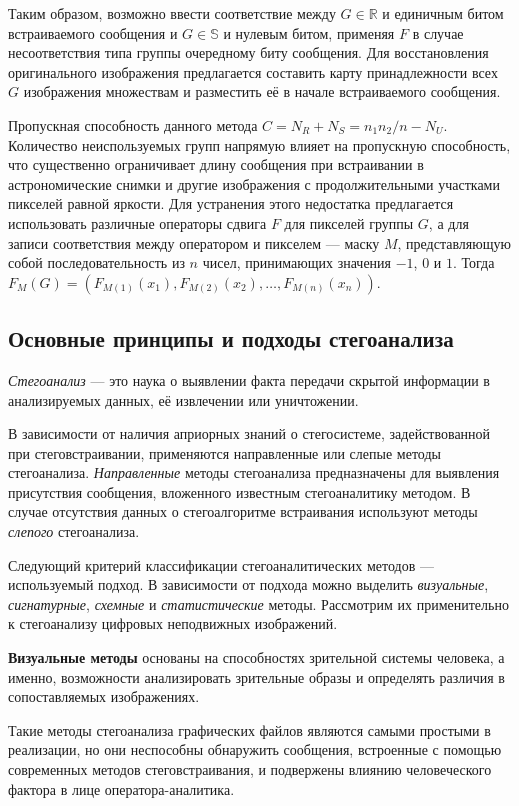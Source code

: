 Таким образом, возможно ввести соответствие между $ G \in \mathbb{R} $ и единичным битом встраиваемого сообщения и $ G \in \mathbb{S} $ и нулевым битом, применяя $ F $ в случае несоответствия типа группы очередному биту сообщения. Для восстановления оригинального изображения предлагается составить карту принадлежности всех $ G $ изображения множествам и разместить её в начале встраиваемого сообщения.

Пропускная способность данного метода $ C = N_R + N_S = {n_1}{n_2}/{n} - N_U $. Количество неиспользуемых групп напрямую влияет на пропускную способность, что существенно ограничивает длину сообщения при встраивании в астрономические снимки и другие изображения с продолжительными участками пикселей равной яркости. Для устранения этого недостатка предлагается использовать различные операторы сдвига $ F $ для пикселей группы $ G $, а для записи соответствия между оператором и пикселем --- маску $ M $, представляющую собой последовательность из $ n $ чисел, принимающих значения $ -1 $, $ 0 $ и $ 1 $. Тогда $ F_M(G) = (F_{M(1)}(x_1), F_{M(2)}(x_2), \ldots, F_{M(n)}(x_n)) $.

\subsection{Основные принципы и подходы стегоанализа}

\textit{Стегоанализ} — это наука о выявлении факта передачи скрытой информации в анализируемых данных, её извлечении или уничтожении.

В зависимости от наличия априорных знаний о стегосистеме, задействованной при стеговстраивании, применяются направленные или слепые методы стегоанализа. \textit{Направленные} методы стегоанализа предназначены для выявления присутствия сообщения, вложенного известным стегоаналитику методом. В случае отсутствия данных о стегоалгоритме встраивания используют методы \textit{слепого} стегоанализа.

Следующий критерий классификации стегоаналитических методов --- используемый подход. В зависимости от подхода можно выделить \textit{визуальные}, \textit{сигнатурные}, \textit{схемные} и \textit{статистические} методы. Рассмотрим их применительно к стегоанализу цифровых неподвижных изображений.

\textbf{Визуальные методы} основаны на способностях зрительной системы человека, а именно, возможности анализировать зрительные образы и определять различия в сопоставляемых изображениях.

Такие методы стегоанализа графических файлов являются самыми простыми в реализации, но они неспособны обнаружить сообщения, встроенные с помощью современных методов стеговстраивания, и подвержены влиянию человеческого фактора в лице оператора-аналитика.

